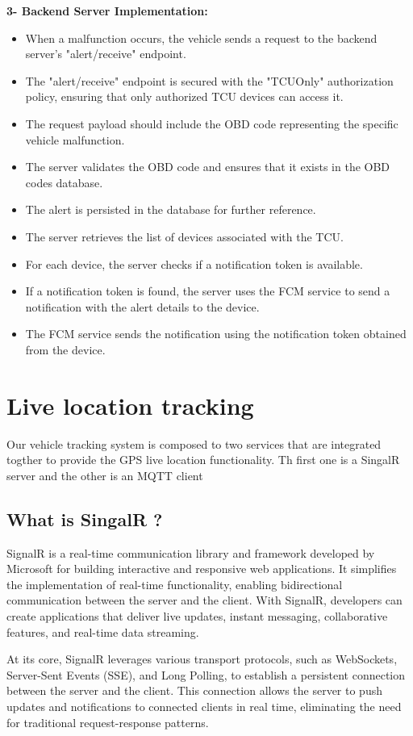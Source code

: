\documentclass[
12pt,
oneside, 
onehalfspacing, 
nolistspacing, 
parskip, 
chapterinoneline, 
]{AASTCOMPUTER}
\begin{document}
\textbf{3- Backend Server Implementation:}

\begin{itemize}
\item When a malfunction occurs, the vehicle sends a request to the backend server's "alert/receive" endpoint.
\item The "alert/receive" endpoint is secured with the "TCUOnly" authorization policy, ensuring that only authorized TCU devices can access it.
\item The request payload should include the OBD code representing the specific vehicle malfunction.
\item The server validates the OBD code and ensures that it exists in the OBD codes database.
\item The alert is persisted in the database for further reference.
\item The server retrieves the list of devices associated with the TCU.
\item For each device, the server checks if a notification token is available.
\item If a notification token is found, the server uses the FCM service to send a notification with the alert details to the device.
\item The FCM service sends the notification using the notification token obtained from the device.
\end{itemize}

\section{Live location tracking}
Our vehicle tracking system is composed to two services that are integrated togther to provide the GPS live location functionality. Th first one is a SingalR server and the other is an MQTT client
\subsection{What is SingalR ?}
SignalR is a real-time communication library and framework developed by Microsoft for building interactive and responsive web applications. It simplifies the implementation of real-time functionality, enabling bidirectional communication between the server and the client. With SignalR, developers can create applications that deliver live updates, instant messaging, collaborative features, and real-time data streaming.

At its core, SignalR leverages various transport protocols, such as WebSockets, Server-Sent Events (SSE), and Long Polling, to establish a persistent connection between the server and the client. This connection allows the server to push updates and notifications to connected clients in real time, eliminating the need for traditional request-response patterns.
\end{document}
